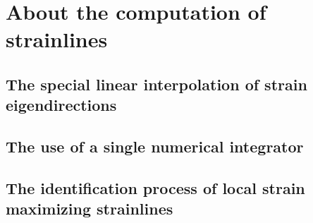 \section{About the computation of strainlines}
\label{sec:about_the_computation_of_strainlines}

\subsection{The special linear interpolation of strain eigendirections}
\label{sub:the_special_linear_interpolation_of_strain_eigendirections}

\subsection{The use of a single numerical integrator}
\label{sub:the_use_of_a_single_numerical_integrator}

\subsection{The identification process of local strain maximizing strainlines}
\label{sub:the_identification_process_of_local_strain_maximizing_strainlines}






